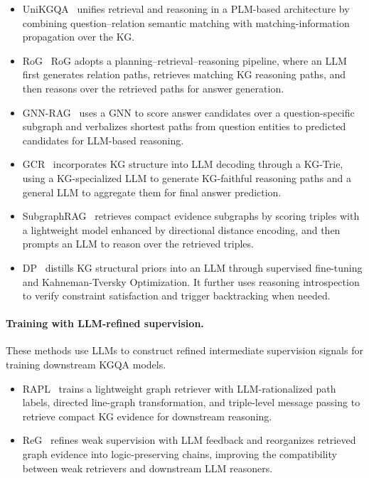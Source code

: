 \documentclass{article}
\begin{document}
\begin{itemize}
    \item UniKGQA~\citep{jiang_unikgqa_2023} unifies retrieval and reasoning in a PLM-based architecture by combining question--relation semantic matching with matching-information propagation over the KG.

    \item RoG~\citep{luo_rog_2024} RoG adopts a planning--retrieval--reasoning pipeline, where an LLM first generates relation paths, retrieves matching KG reasoning paths, and then reasons over the retrieved paths for answer generation.

    \item GNN-RAG~\citep{mavromatis_gnnrag_2025} uses a GNN to score answer candidates over a question-specific subgraph and verbalizes shortest paths from question entities to predicted candidates for LLM-based reasoning.

    \item GCR~\citep{luo_gcr_2025} incorporates KG structure into LLM decoding through a KG-Trie, using a KG-specialized LLM to generate KG-faithful reasoning paths and a general LLM to aggregate them for final answer prediction.

    \item SubgraphRAG~\citep{li_subgraphrag_2025} retrieves compact evidence subgraphs by scoring triples with a lightweight model enhanced by directional distance encoding, and then prompts an LLM to reason over the retrieved triples.

    \item DP~\citep{ma_dp_2025} distills KG structural priors into an LLM through supervised fine-tuning and Kahneman-Tversky Optimization. It further uses reasoning introspection to verify constraint satisfaction and trigger backtracking when needed.
    
\end{itemize}

\paragraph{Training with LLM-refined supervision.} These methods use LLMs to construct refined intermediate supervision signals for training downstream KGQA models.

\begin{itemize}
    \item RAPL~\citep{yao_rapl_2025} trains a lightweight graph retriever with LLM-rationalized path labels, directed line-graph transformation, and triple-level message passing to retrieve compact KG evidence for downstream reasoning.

    \item ReG~\citep{zou_reg_2025} refines weak supervision with LLM feedback and reorganizes retrieved graph evidence into logic-preserving chains, improving the compatibility between weak retrievers and downstream LLM reasoners.
\end{itemize}
\end{document}
